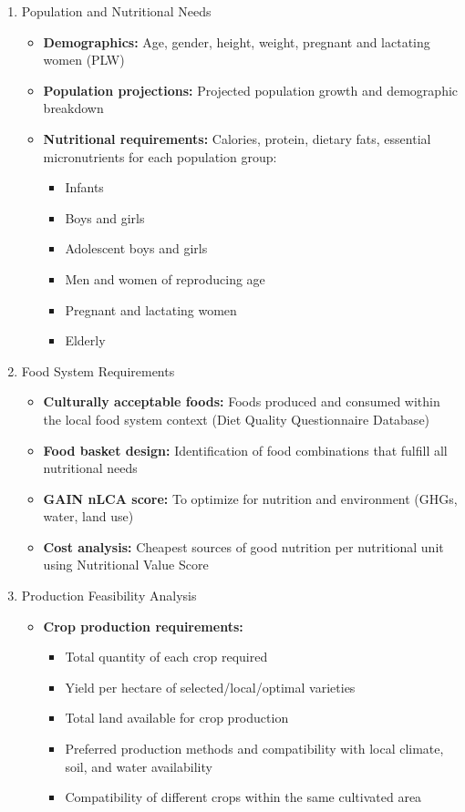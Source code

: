 \begin{enumerate}


\item{Population and Nutritional Needs}
\begin{itemize}
    \item \textbf{Demographics:} Age, gender, height, weight, pregnant and lactating women (PLW)
    \item \textbf{Population projections:} Projected population growth and demographic breakdown
    \item \textbf{Nutritional requirements:} Calories, protein, dietary fats, essential micronutrients for each population group:
    \begin{itemize}
        \item Infants
        \item Boys and girls
        \item Adolescent boys and girls
        \item Men and women of reproducing age
        \item Pregnant and lactating women
        \item Elderly
    \end{itemize}
\end{itemize}

\item{Food System Requirements}
\begin{itemize}
    \item \textbf{Culturally acceptable foods:} Foods produced and consumed within the local food system context (Diet Quality Questionnaire Database)
    \item \textbf{Food basket design:} Identification of food combinations that fulfill all nutritional needs
    \item \textbf{GAIN nLCA score:} To optimize for nutrition and environment (GHGs, water, land use)
    \item \textbf{Cost analysis:} Cheapest sources of good nutrition per nutritional unit using Nutritional Value Score
\end{itemize}


\item{Production Feasibility Analysis}
\begin{itemize}
    \item \textbf{Crop production requirements:}


\begin{itemize}
    \item Total quantity of each crop required
    \item Yield per hectare of selected/local/optimal varieties
    \item Total land available for crop production
    \item Preferred production methods and compatibility with local climate, soil, and water availability
    \item Compatibility of different crops within the same cultivated area
\end{itemize}


\end{itemize}
\end{enumerate}
